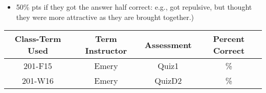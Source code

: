 \begin{rubric}

\begin{itemize}
	\item 50\% pts if they got the answer half correct: e.g., got repulsive, but thought they were more attractive as they are brought together.) 
\end{itemize}

\end{rubric}

\begin{outcomes}
	\begin{center}
		\begin{tabular}{cccc}
			\hline\hline
			Class-Term Used & Term Instructor & Assessment & Percent Correct\\
			\hline
			201-F15 & Emery & Quiz1 & \%\\    %
			201-W16 & Emery & QuizD2 & \%\\    %
			\hline
		\end{tabular}
	\end{center}
\end{outcomes}

\begin{comments}
	
\end{comments}
